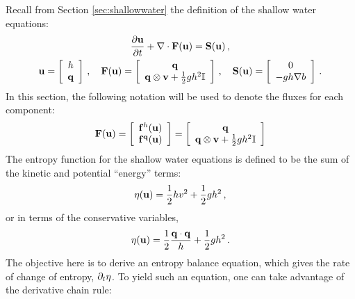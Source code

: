 Recall from Section \ref{sec:shallowwater} the definition of the shallow
water equations:
\begin{gather}
  \ppt{\vectorsolution} + \nabla\cdot\consfluxvector
  = \conssource \eqc
\\
  \vectorsolution
    = \left[\begin{array}{c}\height\\\heightmomentum\end{array}\right]
  \eqc\quad
  \consfluxvector
  = \left[\begin{array}{c}\heightmomentum\\
    \heightmomentum\otimes\velocity + \half\gravity\height^2\mathbb{I}
    \end{array}\right]
  \eqc\quad
  \conssource
  = \left[\begin{array}{c}0\\-\gravity\height\nabla\bathymetry\end{array}
    \right] \eqp
\end{gather}
In this section, the following notation will be used to denote the fluxes
for each component:
\begin{equation}
  \consfluxvector
  = \left[\begin{array}{c}
    \mathbf{\consfluxletter}^\height(\vectorsolution)\\
    \mathbf{\consfluxletter}^\heightmomentum(\vectorsolution)
    \end{array}\right]
  = \left[\begin{array}{c}\heightmomentum\\
    \heightmomentum\otimes\velocity + \half\gravity\height^2\mathbb{I}
    \end{array}\right]
\end{equation}
The entropy function for the shallow water equations is defined to be
the sum of the kinetic and potential ``energy'' terms:
\begin{equation}
  \eta(\mathbf{u}) = \frac{1}{2}hv^2 + \frac{1}{2}gh^2 \,,
\end{equation}
or in terms of the conservative variables,
\begin{equation}
  \eta(\mathbf{u}) = \frac{1}{2}\frac{\mathbf{q}\cdot\mathbf{q}}
  {h} + \frac{1}{2}gh^2 \,.
\end{equation}
The objective here is to derive an entropy balance equation, which gives the
rate of change of entropy, $\partial_t\eta$. To yield such an
equation, one can take advantage of the derivative chain rule:
